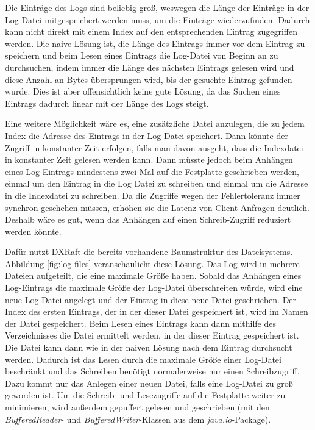 Die Einträge des Logs sind beliebig groß, weswegen die Länge der Einträge in der Log-Datei mitgespeichert werden muss, um die Einträge wiederzufinden. Dadurch kann nicht direkt mit einem Index auf den entsprechenden Eintrag zugegriffen werden. Die naive Lösung ist, die Länge des Eintrags immer vor dem Eintrag zu speichern und beim Lesen eines Eintrags die Log-Datei von Beginn an zu durchsuchen, indem immer die Länge des nächsten Eintrags gelesen wird und diese Anzahl an Bytes übersprungen wird, bis der gesuchte Eintrag gefunden wurde. Dies ist aber offensichtlich keine gute Lösung, da das Suchen eines Eintrags dadurch linear mit der Länge des Logs steigt.

Eine weitere Möglichkeit wäre es, eine zusätzliche Datei anzulegen, die zu jedem Index die Adresse des Eintrags in der Log-Datei speichert. Dann könnte der Zugriff in konstanter Zeit erfolgen, falls man davon ausgeht, dass die Indexdatei in konstanter Zeit gelesen werden kann. Dann müsste jedoch beim Anhängen eines Log-Eintrags mindestens zwei Mal auf die Festplatte geschrieben werden, einmal um den Eintrag in die Log Datei zu schreiben und einmal um die Adresse in die Indexdatei zu schreiben. Da die Zugriffe wegen der Fehlertoleranz immer synchron geschehen müssen, erhöhen sie die Latenz von Client-Anfragen deutlich. Deshalb wäre es gut, wenn das Anhängen auf einen Schreib-Zugriff reduziert werden könnte.

Dafür nutzt DXRaft die bereits vorhandene Baumstruktur des Dateisystems. Abbildung \ref{fig:log-files} veranschaulicht diese Lösung. Das Log wird in mehrere Dateien aufgeteilt, die eine maximale Größe haben. Sobald das Anhängen eines Log-Eintrags die maximale Größe der Log-Datei überschreiten würde, wird eine neue Log-Datei angelegt und der Eintrag in diese neue Datei geschrieben. Der Index des ersten Eintrags, der in der dieser Datei gespeichert ist, wird im Namen der Datei gespeichert. Beim Lesen eines Eintrags kann dann mithilfe des Verzeichnisses die Datei ermittelt werden, in der dieser Eintrag gespeichert ist. Die Datei kann dann wie in der naiven Lösung nach dem Eintrag durchsucht werden. Dadurch ist das Lesen durch die maximale Größe einer Log-Datei beschränkt und das Schreiben benötigt normalerweise nur einen Schreibzugriff. Dazu kommt nur das Anlegen einer neuen Datei, falls eine Log-Datei zu groß geworden ist. Um die Schreib- und Lesezugriffe auf die Festplatte weiter zu minimieren, wird außerdem gepuffert gelesen und geschrieben (mit den \textit{BufferedReader}- und \textit{BufferedWriter}-Klassen aus dem \textit{java.io}-Package).
		
